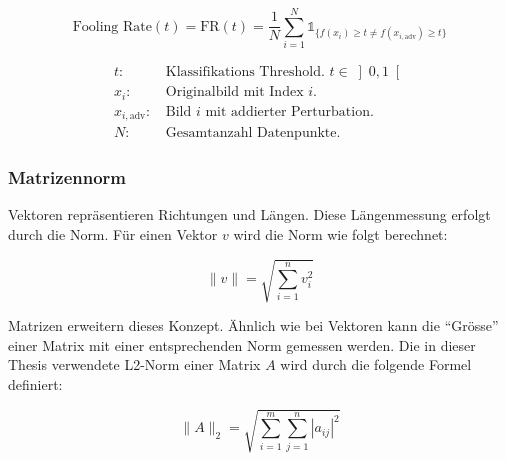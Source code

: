 \begin{equation}
    \text{Fooling Rate}(t) = \text{FR}(t) = \frac{1}{N} \sum_{i=1}^{N} \mathds{1}_{\{f(x_i) \geq t \neq f(x_{i,\text{adv}}) \geq t\}}
    \label{eq:Fooling Rate}
\end{equation}

\begin{align*}
    t\text{:} &\text{ Klassifikations Threshold. } t \in \left] 0, 1 \right[ \\
    x_i\text{:} &\text{ Originalbild mit Index $i$.} \\
    x_{i,\text{adv}}\text{:} &\text{ Bild $i$ mit addierter Perturbation.} \\
    N\text{:} &\text{ Gesamtanzahl Datenpunkte.}
\end{align*}

\subsubsection{Matrizennorm} \label{chap:matrizennorm}
Vektoren repräsentieren Richtungen und Längen. Diese Längenmessung erfolgt durch die Norm. Für einen Vektor $v$ wird die Norm wie folgt berechnet:

\begin{equation}
    \| v \| = \sqrt{\sum_{i=1}^{n} v_i^2}
    \label{eq:Vektornorm}
\end{equation}

Matrizen erweitern dieses Konzept. Ähnlich wie bei Vektoren kann die ``Grösse'' einer Matrix mit einer entsprechenden Norm gemessen werden. Die in dieser Thesis verwendete L2-Norm einer Matrix $A$ wird durch die folgende Formel definiert:

\begin{equation}
    \| A \|_2 = \sqrt{\sum_{i=1}^{m} \sum_{j=1}^{n} |a_{ij}|^2}
    \label{eq:Matrixnorm}
\end{equation}